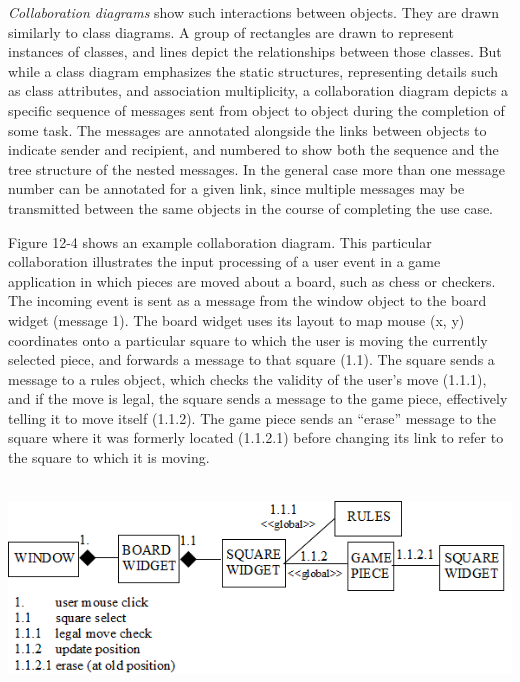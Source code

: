 \textit{Collaboration diagrams} show such
interactions between objects. They are drawn similarly to class diagrams. A
group of rectangles are drawn to represent instances of
classes, and lines depict the relationships between those classes. But while a
class diagram emphasizes the static structures, representing details such as
class attributes, and association multiplicity, a collaboration diagram depicts
a specific sequence of messages sent from object to object during the
completion of some task. The messages are annotated alongside the
links between objects to indicate sender and recipient, and numbered
to show both the sequence and the tree structure of the
nested messages. In the general case more than
one message number can be annotated for a given link, since multiple messages may be transmitted between the same
objects in the course of completing the use case.

Figure 12-4 shows an example collaboration diagram. This particular
collaboration illustrates the input processing of a user event in a game
application in which pieces are moved about a board, such as chess or
checkers. The incoming event is sent as a message from the window object to the
board widget (message 1). The board widget uses its layout to map mouse (x, y)
coordinates onto a particular square to which the user is moving the currently
selected piece, and forwards a message to that square (1.1). The square sends a
message to a rules object, which checks the validity of the user's move
(1.1.1), and if the move is legal, the square sends a message to the
game piece, effectively telling it to move itself (1.1.2). The game
piece sends an ``erase''
message to the square where it was formerly located (1.1.2.1) before changing
its link to refer to the square to which it is moving.

\bigskip

\includegraphics[width=5.8in,height=2.2in]{ub-img/collabor.png}


